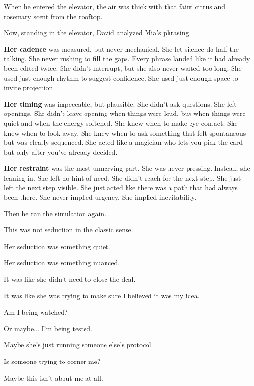 When he entered the elevator, the air was thick with that faint citrus and rosemary scent 
from the rooftop. 

Now, standing in the elevator, David analyzed Mia’s phrasing.

\textbf{Her cadence} was measured, but never mechanical.
She let silence do half the talking. She never rushing to fill the gaps.
Every phrase landed like it had already been edited twice.
She didn’t interrupt, but she also never waited too long.
She used just enough rhythm to suggest confidence.
She used just enough space to invite projection.

\textbf{Her timing} was impeccable, but plausible.
She didn’t ask questions. She left openings.
She didn't leave opening when things were loud, but when things were quiet
and when the energy softened.
She knew when to make eye contact. 
She knew when to look away. 
She knew when to ask something that felt spontaneous but was clearly sequenced.
She acted like a magician who lets you pick the card—but only after you've already decided.

\textbf{Her restraint} was the most unnerving part.
She was never pressing. Instead, she leaning in. She left no hint of need.
She didn’t reach for the next step. She just left the next step visible.
She just acted like there was a path that had always been there.
She never implied urgency.
She implied inevitability.

Then he ran the simulation again.

\begin{tcolorbox}[
    enhanced,
    sharp corners,
    boxrule=0pt,
    colback=gray!3,
    borderline west={2pt}{0pt}{gray!60}, %
    left=10pt,
    right=10pt,
    top=6pt,
    bottom=6pt,
    width=\linewidth,
    fontupper=\small\itshape
  ]
This was not seduction in the classic sense.

Her seduction was something quiet.

Her seduction was something nuanced.

It was like she didn’t need to close the deal.

It was like she was trying to make sure I believed it was my idea.

Am I being watched?

Or maybe... I'm being tested. 

Maybe she's just running someone else's protocol.

Is someone trying to corner me?

Maybe this isn't about me at all.

\end{tcolorbox}


